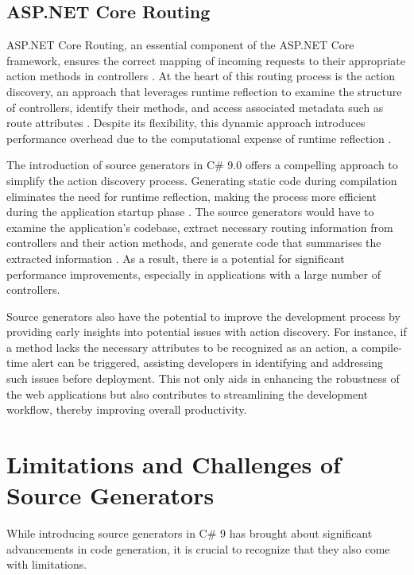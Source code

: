 \subsection{ASP.NET Core Routing}

ASP.NET Core Routing, an essential component of the ASP.NET Core framework, ensures the correct mapping of incoming requests to their appropriate action methods in controllers \cite{Microsoft2023RoutingCore}. At the heart of this routing process is the action discovery, an approach that leverages runtime reflection to examine the structure of controllers, identify their methods, and access associated metadata such as route attributes \cite{Microsoft2023RoutingCore}. Despite its flexibility, this dynamic approach introduces performance overhead due to the computational expense of runtime reflection \cite{Microsoft2023RoutingCore}.

The introduction of source generators in C\# 9.0 offers a compelling approach to simplify the action discovery process. Generating static code during compilation eliminates the need for runtime reflection, making the process more efficient during the application startup phase \cite{CSharpRoslyn}. The source generators would have to examine the application's codebase, extract necessary routing information from controllers and their action methods, and generate code that summarises the extracted information \cite{Carter2020}. As a result, there is a potential for significant performance improvements, especially in applications with a large number of controllers.

Source generators also have the potential to improve the development process by providing early insights into potential issues with action discovery. For instance, if a method lacks the necessary attributes to be recognized as an action, a compile-time alert can be triggered, assisting developers in identifying and addressing such issues before deployment. This not only aids in enhancing the robustness of the web applications but also contributes to streamlining the development workflow, thereby improving overall productivity.

\section{Limitations and Challenges of Source Generators}

While introducing source generators in C\# 9 has brought about significant advancements in code generation, it is crucial to recognize that they also come with limitations.


